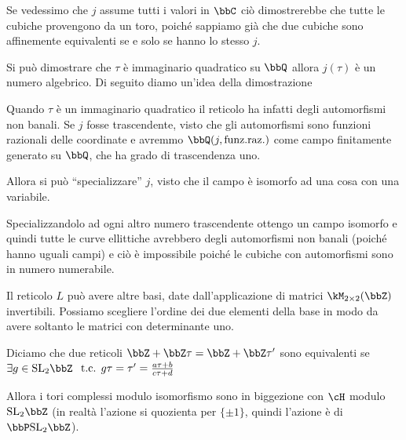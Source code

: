 \begin{osservazione} \label{170123-j_suriettiva}
  Se vedessimo che $j$ assume tutti i valori in $\bbC$ ciò dimostrerebbe
  che tutte le cubiche provengono da un toro, poiché sappiamo già che
  due cubiche sono affinemente equivalenti se e solo se hanno lo stesso $j$.
\end{osservazione}

\begin{divagazione}
  Si può dimostrare che $\tau$ è immaginario quadratico su $\bbQ$ allora
  $j(\tau)$ è un numero algebrico. Di seguito diamo un'idea della dimostrazione

  Quando $\tau$ è un immaginario quadratico il reticolo ha infatti degli
  automorfismi non banali. Se $j$ fosse trascendente, visto che gli
  automorfismi sono funzioni razionali delle coordinate e avremmo
  $\bbQ(j, \text{funz.raz.})$ come campo finitamente generato su $\bbQ$,
  che ha grado di trascendenza uno.

  Allora si può ``specializzare'' $j$, visto che il campo è isomorfo ad
  una cosa con una variabile.

  
  Specializzandolo ad ogni altro numero trascendente ottengo un campo
  isomorfo e quindi tutte le curve ellittiche avrebbero degli
  automorfismi non banali (poiché hanno uguali campi) e ciò è
  impossibile poiché le cubiche con automorfismi sono in numero
  numerabile.
\end{divagazione}

Il reticolo $L$ può avere altre basi, date dall'applicazione di matrici
$\kM_{2 \times 2} (\bbZ)$ invertibili. Possiamo scegliere l'ordine dei
due elementi della base in modo da avere soltanto le matrici con
determinante uno.

Diciamo che due reticoli $\bbZ + \bbZ \tau = \bbZ + \bbZ \tau'$ sono
equivalenti se $\exists g \in \SL_2 \bbZ$
$\text{ t.c. } g\tau = \tau' = \frac{a \tau + b}{c \tau + d}$

Allora i tori complessi modulo isomorfismo sono in biggezione con $\cH$
modulo $\SL_2 \bbZ$ (in realtà l'azione si quozienta per $\{\pm 1\}$,
quindi l'azione è di $\bbP\SL_2 \bbZ$).


